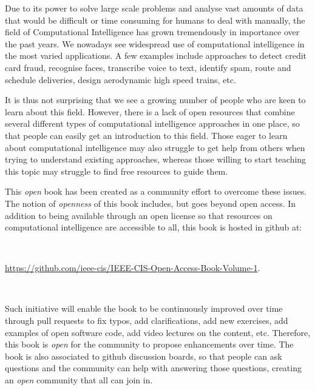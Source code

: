 %
%

\preface

Due to its power to solve large scale problems and analyse vast amounts of data that would be difficult or time consuming for humans to deal with manually, the field of Computational Intelligence has grown tremendously in importance over the past years. We nowadays see widespread use of computational intelligence in the most varied applications. A few examples include approaches to detect credit card fraud, recognise faces, transcribe voice to text, identify spam, route and schedule deliveries, design aerodynamic high speed trains, etc. 

It is thus not surprising that we see a growing number of people who are keen to learn about this field. However, there is a lack of open resources that combine several different types of computational intelligence approaches in one place, so that people can easily get an introduction to this field. Those eager to learn about computational intelligence may also struggle to get help from others when trying to understand existing approaches, whereas those willing to start teaching this topic may struggle to find free resources to guide them. 

This \textit{open} book has been created as a community effort to overcome these issues. The notion of \textit{openness} of this book includes, but goes beyond open access. In addition to being available through an open license so that resources on computational intelligence are accessible to all, this book is hosted in github at:

\

\noindent \url{https://github.com/ieee-cis/IEEE-CIS-Open-Access-Book-Volume-1}. 

\

Such initiative will enable the book to be continuously improved over time through pull requests to fix typos, add clarifications, add new exercises, add examples of open software code, add video lectures on the content, etc. Therefore, this book is \textit{open} for the community to propose enhancements over time. The book is also associated to github discussion boards, so that people can ask questions and the community can help with answering those questions, creating an \textit{open} community that all can join in. 

